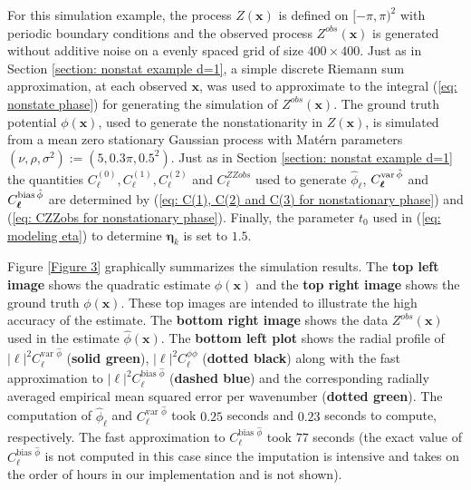 \documentclass[10pt,noinfoline]{imsart}
\newcommand{\bs}{\boldsymbol}
\begin{document}
For this simulation example, the process $Z(\bs x)$  is defined on $[-\pi,\pi)^2$ with periodic boundary conditions and the observed process $Z^{obs}(\bs x)$ is generated without additive noise on a evenly spaced grid of size $400 \times 400$. Just as in Section \ref{section: nonstat example d=1}, a simple discrete Riemann sum approximation, at each observed $\bs x$, was used to approximate to the integral (\ref{eq: nonstate phase}) for generating the simulation of $Z^{obs}(\bs x)$. 
The ground truth potential $\phi(\bs x)$, used to generate the nonstationarity in $Z(\bs x)$, is simulated from a mean zero stationary Gaussian process with Mat\'ern parameters $(\nu, \rho, \sigma^2):=(5, 0.3 \pi, 0.5^2)$. Just as in Section \ref{section: nonstat example d=1} the quantities $C^{(0)}_{\bs \ell}, C^{(1)}_{\bs \ell}, C^{(2)}_{\bs \ell}$ and $C^{ZZobs}_{\bs \ell}$ used to generate  $\hat\phi_{\bs\ell}$, $C^{\text{var\,}\hat\phi}_{\bs\ell}$ and $C^{\text{bias\,}\hat\phi}_{\bs \ell}$ are determined by (\ref{eq: C(1), C(2) and C(3) for nonstationary phase}) and (\ref{eq: CZZobs for nonstationary phase}). Finally, the parameter $t_0$ used in (\ref{eq: modeling eta}) to determine $\bs \eta_k$ is set to $1.5$.





Figure \ref{Figure 3} graphically summarizes the simulation results. The \textbf{top left image} shows the quadratic estimate $\hat\phi(\bs x)$ and the \textbf{top right image} shows the ground truth $\phi(\bs x)$. These top images are intended to illustrate the high accuracy of the estimate. The \textbf{bottom right image} shows the data $Z^{obs}(\bs x)$ used in the estimate $\hat\phi(\bs x)$. The \textbf{bottom left plot} shows the radial profile of $|\bs \ell|^2C_{\bs \ell}^{\text{var }\hat\phi}$ (\textbf{solid green}), $|\bs \ell|^2C_{\bs \ell}^{\phi\phi}$ (\textbf{dotted black}) along with the fast approximation to $|\bs \ell|^2C_{\bs \ell}^{\text{bias }\hat\phi}$ (\textbf{dashed blue}) and the corresponding radially averaged empirical mean squared error per wavenumber (\textbf{dotted green}). The computation of $\hat\phi_{\bs \ell}$ and  $C_{\bs \ell}^{\text{var }\hat\phi}$ took $0.25$ seconds and $0.23$ seconds to compute, respectively. The fast approximation to $C_{\bs \ell}^{\text{bias }\hat\phi}$ took $77$ seconds (the exact value of $C_{\bs \ell}^{\text{bias }\hat\phi}$ is not computed in this case since the imputation is intensive and takes on the order of hours in our implementation and is not shown).
\end{document}
